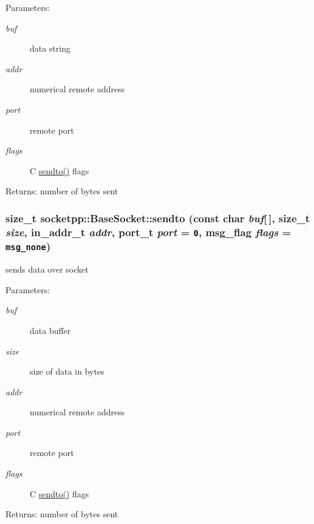 \begin{CompactItemize}
\begin{Desc}
\item[Parameters:]
\begin{description}
\item[{\em buf}]data string \item[{\em addr}]numerical remote address \item[{\em port}]remote port \item[{\em flags}]C \hyperlink{classsocketpp_1_1BaseSocket_d6df36281c6fce81e5c4c493ac91a6f8}{sendto()} flags \end{description}
\end{Desc}
\begin{Desc}
\item[Returns:]number of bytes sent \end{Desc}
\hypertarget{classsocketpp_1_1BaseSocket_d6df36281c6fce81e5c4c493ac91a6f8}{
\subsubsection[{sendto}]{\setlength{\rightskip}{0pt plus 5cm}size\_\-t socketpp::BaseSocket::sendto (const char {\em buf}\mbox{[}$\,$\mbox{]}, \/  size\_\-t {\em size}, \/  in\_\-addr\_\-t {\em addr}, \/  port\_\-t {\em port} = {\tt 0}, \/  msg\_\-flag {\em flags} = {\tt msg\_\-none})}}
\label{classsocketpp_1_1BaseSocket_d6df36281c6fce81e5c4c493ac91a6f8}


sends data over socket 

\begin{Desc}
\item[Parameters:]
\begin{description}
\item[{\em buf}]data buffer \item[{\em size}]size of data in bytes \item[{\em addr}]numerical remote address \item[{\em port}]remote port \item[{\em flags}]C \hyperlink{classsocketpp_1_1BaseSocket_d6df36281c6fce81e5c4c493ac91a6f8}{sendto()} flags \end{description}
\end{Desc}
\begin{Desc}
\item[Returns:]number of bytes sent \end{Desc}
\hypertarget{classsocketpp_1_1BaseSocket_4cffcd5cae4ef51e953495837fade4c3}{
}
\end{CompactItemize}
